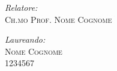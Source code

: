 \begin{titlepage}
    \noindent \textit{\large Relatore:} \\
    \textsc{\large Ch.mo Prof. Nome Cognome}
    
    \vspace{1cm}
    
    \begin{flushright}
        \textit{\large Laureando:}   \\
        \textsc{\large Nome Cognome} \\
        \textsc{1234567}
    \end{flushright}
    
    \vfill
    
    
\end{titlepage}